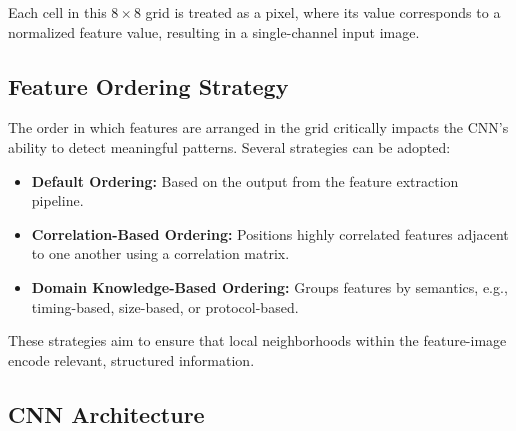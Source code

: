 \documentclass[12pt]{report}
\begin{document}
Each cell in this $8 \times 8$ grid is treated as a pixel, where its value corresponds to a normalized feature value, resulting in a single-channel input image.

\subsection{Feature Ordering Strategy}

The order in which features are arranged in the grid critically impacts the CNN’s ability to detect meaningful patterns. Several strategies can be adopted:

\begin{itemize}
    \item \textbf{Default Ordering:} Based on the output from the feature extraction pipeline.
    \item \textbf{Correlation-Based Ordering:} Positions highly correlated features adjacent to one another using a correlation matrix.
    \item \textbf{Domain Knowledge-Based Ordering:} Groups features by semantics, e.g., timing-based, size-based, or protocol-based.
\end{itemize}

These strategies aim to ensure that local neighborhoods within the feature-image encode relevant, structured information.

\subsection{CNN Architecture}
\end{document}
